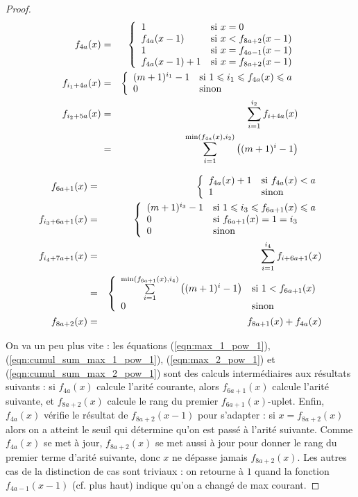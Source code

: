 \begin{proof}
			\begin{eqnarray}
				f_{4a}(x) & = & \left\lbrace \begin{array}{ll} 
									1 & \text{si $x = 0$} \\
									f_{4a}(x-1) & \text{si $x < f_{8a+2}(x-1)$}\\
									1 & \text{si $x = f_{4a-1}(x-1)$} \\
									f_{4a}(x-1) + 1 & \text{si $x = f_{8a+2}(x-1)$} 
									 \end{array} \right. \label{eqn:f_4a_arite_courante} \\
				f_{i_1+4a}(x) & = & \left\lbrace \begin{array}{ll} 
										(m+1)^{i_1} - 1 & \text{si $1 \leqslant i_1 \leqslant f_{4a}(x) \leqslant a$} \\
										0 & \text{sinon}
										 \end{array} \right. \label{eqn:max_1_pow_1}\\
				f_{i_2+5a}(x) & = & \sum_{i=1}^{i_2} f_{i+4a}(x)\label{eqn:cumul_sum_max_1_pow_1} \\
					& = & \sum_{i=1}^{\min\left(f_{4a}(x), i_2\right)} \left((m+1)^{i} - 1\right) \nonumber\\
			\end{eqnarray}
			
			\begin{eqnarray}
				f_{6a +1}(x) & = & \left\lbrace \begin{array}{ll} 
										f_{4a}(x)+1 & \text{si $f_{4a}(x) < a$} \\
										1 	& \text{sinon}
										 \end{array} \right. \label{eqn:f_4a_arite_suivante}\\
				f_{i_3+6a+1}(x) & = & \left\lbrace \begin{array}{ll} 
										(m+1)^{i_3} - 1 & \text{si $1 \leqslant i_3 \leqslant f_{6a +1}(x) \leqslant a$} \\
										0 & \text{si $f_{6a +1}(x)=1 = i_3$} \\
										0 & \text{sinon} 
										 \end{array} \right. \label{eqn:max_2_pow_1}\\
				f_{i_4+7a+1}(x) & = & \sum_{i=1}^{i_4} f_{i+6a+1}(x)\label{eqn:cumul_sum_max_2_pow_1} \\
					& = & \left\lbrace \begin{array}{ll} 
								\sum\limits_{i=1}^{\min\left(f_{6a+1}(x), i_4\right)} \left((m+1)^{i} - 1\right) & \text{si $1 < f_{6a +1}(x)$} \\
								0 & \text{sinon}
								 \end{array} \right. \nonumber \\
				f_{8a+2}(x) & = & f_{8a+1}(x) + f_{4a}(x) \label{eqn:rang_arite_suivante}
			\end{eqnarray}
			
			
			On va un peu plus vite : les équations (\ref{eqn:max_1_pow_1}), (\ref{eqn:cumul_sum_max_1_pow_1}), (\ref{eqn:max_2_pow_1}) et (\ref{eqn:cumul_sum_max_2_pow_1}) sont des calculs intermédiaires aux résultats suivants : si $f_{4a}(x)$ calcule l'arité courante, alors $f_{6a +1}(x)$ calcule l'arité suivante, et $f_{8a+2}(x)$ calcule le rang du premier $f_{6a +1}(x)$-uplet. Enfin, $f_{4a}(x)$ vérifie le résultat de $f_{8a+2}(x-1)$ pour s'adapter : si $x = f_{8a+2}(x)$ alors on a atteint le seuil qui détermine qu'on est passé à l'arité suivante. Comme $f_{4a}(x)$ se met à jour, $f_{8a+2}(x)$ se met aussi à jour pour donner le rang du premier terme d'arité suivante, donc $x$ ne dépasse jamais $f_{8a+2}(x)$. Les autres cas de la distinction de cas sont triviaux : on retourne à $1$ quand la fonction $f_{4a-1}(x-1)$ (cf. plus haut) indique qu'on a changé de max courant.
			

\end{proof}
